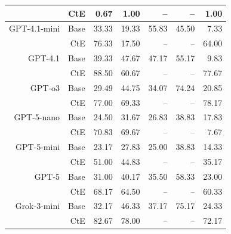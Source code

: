 \begin{table}[!t]
\begin{tabular}{r r !{\color{white!80!black} \vline} r r r r r}
 & CtE & 0.67 & 1.00 & -- & -- & 1.00 \\
\midrule
\sf GPT-4.1-mini & Base & 33.33 & 19.33 & 55.83 & 45.50 & 7.33 \\
 & CtE & 76.33 & 17.50 & -- & -- & 64.00 \\
\midrule
\sf GPT-4.1 & Base & 39.33 & 47.67 & 47.17 & 55.17 & 9.83 \\
 & CtE & 88.50 & 60.67 & -- & -- & 77.67 \\
\midrule
\sf GPT-o3 & Base & 29.49 & 44.75 & 34.07 & 74.24 & 20.85 \\
 & CtE & 77.00 & 69.33 & -- & -- & 78.17 \\
\midrule
\sf GPT-5-nano & Base & 24.50 & 31.67 & 26.83 & 38.83 & 17.83 \\
 & CtE & 70.83 & 69.67 & -- & -- & 7.67 \\
\midrule
\sf GPT-5-mini & Base & 23.17 & 27.83 & 25.00 & 38.83 & 14.33 \\
 & CtE & 51.00 & 44.83 & -- & -- & 35.17 \\
\midrule
\sf GPT-5 & Base & 31.00 & 40.17 & 35.50 & 58.33 & 23.00 \\
 & CtE & 68.17 & 64.50 & -- & -- & 60.33 \\
\midrule
\sf Grok-3-mini & Base & 32.17 & 46.33 & 37.17 & 75.17 & 24.33 \\
 & CtE & 82.67 & 78.00 & -- & -- & 72.17 \\
\bottomrule
\end{tabular}
\label{tab:cRi_by_id_act}
\end{table}